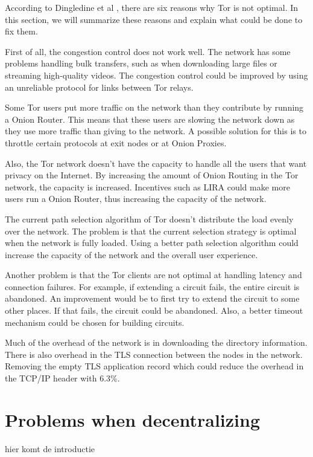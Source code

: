 \documentclass[journal]{IEEEtran}
\begin{document}
		According to Dingledine et al \cite{dingledine2009performance}, there are six reasons why Tor is not optimal. In this section, we will summarize these reasons and explain what could be done to fix them.
		
		First of all, the congestion control does not work well. The network has some problems handling bulk transfers, such as when downloading large files or streaming high-quality videos. The congestion control could be improved by using an unreliable protocol for links between Tor relays.		
		
		Some Tor users put more traffic on the network than they contribute by running a Onion Router. This means that these users are slowing the network down as they use more traffic than giving to the network. A possible solution for this is to throttle certain protocols at exit nodes or at Onion Proxies.
		
		Also, the Tor network doesn't have the capacity to handle all the users that want privacy on the Internet. By increasing the amount of Onion Routing in the Tor network, the capacity is increased. Incentives such as LIRA \cite{jansen13lira} could make more users run a Onion Router, thus increasing the capacity of the network.		
		
		The current path selection algorithm of Tor doesn't distribute the load evenly over the network. The problem is that the current selection strategy is optimal when the network is fully loaded. Using a better path selection algorithm could increase the capacity of the network and the overall user experience.		
		
		Another problem is that the Tor clients are not optimal at handling latency and connection failures. For example, if extending a circuit fails, the entire circuit is abandoned. An improvement would be to first try to extend the circuit to some other places. If that fails, the circuit could be abandoned. Also, a better timeout mechanism could be chosen for building circuits.		
		
		Much of the overhead of the network is in downloading the directory information. There is also overhead in the TLS connection between the nodes in the network. Removing the empty TLS application record which could reduce the overhead in the TCP/IP header with 6.3\%.

\section{Problems when decentralizing}
		hier komt de introductie
		
\end{document}

